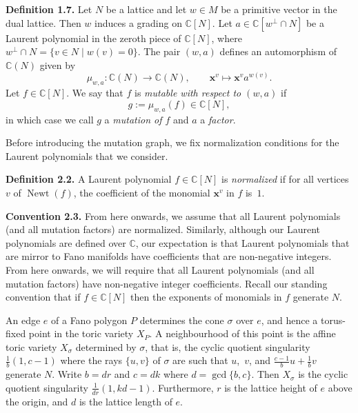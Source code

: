 \documentclass[11pt]{article}
\numberwithin{equation}{section}
\begin{document}
\par\noindent\textbf{Definition 1.7.} 
Let $N$ be a lattice and let $w\in M$ be a primitive vector in the dual lattice. Then $w$ induces a grading on $\mathbb{C}[N]$. Let $a\in\mathbb{C}[w^\perp\cap N]$ be a Laurent polynomial in the zeroth piece of $\mathbb{C}[N]$, where $w^\perp\cap N=\{v\in N\mid w(v)=0\}$. The pair $(w,a)$ defines an automorphism of $\mathbb{C}(N)$ given by
\[
\mu_{w,a}:\mathbb{C}(N)\rightarrow\mathbb{C}(N),\qquad\bm{x}^v\mapsto\bm{x}^v a^{w(v)}.
\]
Let $f\in\mathbb{C}[N]$. We say that $f$ is \emph{mutable with respect to $(w,a)$} if
\[
g:=\mu_{w,a}(f)\in\mathbb{C}[N],
\]
in which case we call $g$ a \emph{mutation of $f$} and $a$ a \emph{factor}.

\par

Before introducing the mutation graph, we fix normalization conditions for the Laurent polynomials that we consider.

\par\noindent\textbf{Definition 2.2.}  \label{def:normalization}
A Laurent polynomial $f\in\mathbb{C}[N]$ is \emph{normalized} if for all vertices $v$ of $\operatorname{Newt}(f)$, the coefficient of the monomial $\bm{x}^v$ in $f$ is~$1$.

\par

\par\noindent\textbf{Convention 2.3.} 
From here onwards, we assume that all Laurent polynomials (and all mutation factors) are normalized. Similarly, although our Laurent polynomials are defined over $\mathbb{C}$, our expectation is that Laurent polynomials that are mirror to Fano manifolds have coefficients that are non-negative integers. From here onwards, we will require that all Laurent polynomials (and all mutation factors) have non-negative integer coefficients. Recall our standing convention that if $f \in \mathbb{C}[N]$ then the exponents of monomials in $f$ generate $N$.

\par

An edge $e$ of a Fano polygon $P$ determines the cone $\sigma$ over $e$, and hence a torus-fixed point in the toric variety $X_P$. A neighbourhood of this point is the affine toric variety $X_\sigma$ determined by $\sigma$, that is, the cyclic quotient singularity $\frac{1}{b}(1,c-1)$ where the rays $\{u,v\}$ of $\sigma$ are such that $u$,~$v$, and $\frac{c-1}{b} u + \frac{1}{b}v$ generate $N$. Write $b = dr$ and $c = dk$ where $d = \gcd\{b,c\}$. Then $X_\sigma$ is the cyclic quotient singularity $\frac{1}{dr}(1,kd-1)$. Furthermore, $r$ is the lattice height of $e$ above the origin, and $d$ is the lattice length of $e$.
\end{document}
